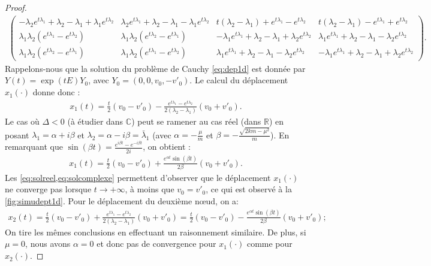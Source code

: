 \begin{proof}
\begin{align*}
\begin{pmatrix}
         -\lambda_2e^{t\lambda_1} + \lambda_2 - \lambda_1 + \lambda_1e^{t\lambda_2} & \lambda_2e^{t\lambda_1} + \lambda_2 - \lambda_1 - \lambda_1e^{t\lambda_2} & t(\lambda_2 -\lambda_1) + e^{t\lambda_1} - e^{t\lambda_2} & t(\lambda_2 -\lambda_1) - e^{t\lambda_1} + e^{t\lambda_2} \\
          \lambda_1\lambda_2 (e^{t\lambda_1} - e^{t\lambda_2}) & \lambda_1\lambda_2 (e^{t\lambda_2} - e^{t\lambda_1})  & -\lambda_1e^{t\lambda_1} + \lambda_2 - \lambda_1 + \lambda_2e^{t\lambda_2} & \lambda_1e^{t\lambda_1} + \lambda_2 - \lambda_1 - \lambda_2e^{t\lambda_2} \\
          \lambda_1\lambda_2 (e^{t\lambda_2} - e^{t\lambda_1})  & \lambda_1\lambda_2 (e^{t\lambda_1} - e^{t\lambda_2})  & \lambda_1e^{t\lambda_1} + \lambda_2 - \lambda_1 - \lambda_2e^{t\lambda_2} & -\lambda_1e^{t\lambda_1} + \lambda_2 - \lambda_1 + \lambda_2e^{t\lambda_2}
    \end{pmatrix}.
\end{align*}
Rappelons-nous que la solution du problème de Cauchy \cref{eq:dep1d} est donnée par $Y(t) = \exp(tE)Y_0$, avec $Y_0 = (0,0,v_0,-v'_0)$. Le calcul du déplacement $x_1(\cdot)$ donne donc :
\begin{align} \label{eq:solreel}
    x_1(t) = \frac{t}{2}\left( v_0 - v'_0 \right) - \frac{e^{t\lambda_1} - e^{t\lambda_2}}{2(\lambda_2 - \lambda_1)}\left( v_0 + v'_0 \right).
\end{align}
Le cas où $\Delta < 0$ (à étudier dans $\mathbb{C}$) peut se ramener au cas réel (dans $\mathbb{R}$) en posant $\lambda_1 = \alpha + i \beta$ et $\lambda_2 = \alpha - i \beta = \bar{\lambda}_1$ (avec $\alpha = -\frac{\mu}{m}$ et $\beta = -\frac{\sqrt{2km - \mu^2}}{m}$). En remarquant que $\sin(\beta t) = \frac{e^{i\beta t} - e^{-i\beta t}}{2i}$, on obtient :
\begin{align} \label{eq:solcomplexe}
    x_1(t) = \frac{t}{2}\left( v_0 - v'_0 \right) + \frac{e^{\alpha t} \sin(\beta t)}{2\beta} \left( v_0 + v'_0 \right).
\end{align}
Les \cref{eq:solreel,eq:solcomplexe} permettent d'observer que le déplacement $x_1(\cdot)$ ne converge pas lorsque $t \rightarrow +\infty$, à moins que $v_0 = v'_0$, ce qui est observé à la \cref{fig:simudept1d}. Pour le déplacement du deuxième n\oe{}ud, on a:
\begin{align} \label{eq:solcomplexe}
    x_2(t) = \frac{t}{2}\left( v_0 - v'_0 \right) + \frac{e^{t\lambda_1} - e^{t\lambda_2}}{2(\lambda_2 - \lambda_1)}\left( v_0 + v'_0 \right) = \frac{t}{2}\left( v_0 - v'_0 \right) - \frac{e^{\alpha t} \sin(\beta t)}{2\beta} \left( v_0 + v'_0 \right);
\end{align}
On tire les mêmes conclusions en effectuant un raisonnement similaire. De plus, si $\mu=0$, nous avons $\alpha=0$ et donc pas de convergence pour $x_1(\cdot)$ comme pour $x_2(\cdot)$. 

\end{proof}










